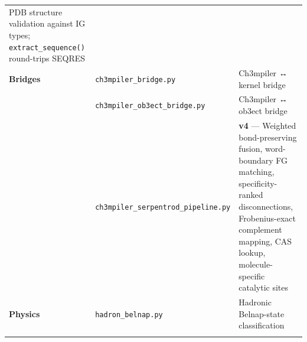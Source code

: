 \documentclass[12pt,a4paper]{article}
\begin{document}
\begin{longtable}[]{@{}lll@{}}
\begin{minipage}[t]{0.42\columnwidth}
PDB structure validation against IG types; \texttt{extract\_sequence()}
round-trips SEQRES\strut
\end{minipage}\tabularnewline
\begin{minipage}[t]{0.23\columnwidth}\raggedright
\textbf{Bridges}\strut
\end{minipage} & \begin{minipage}[t]{0.26\columnwidth}\raggedright
\texttt{ch3mpiler\_bridge.py}\strut
\end{minipage} & \begin{minipage}[t]{0.42\columnwidth}\raggedright
Ch3mpiler ↔ kernel bridge\strut
\end{minipage}\tabularnewline
\begin{minipage}[t]{0.23\columnwidth}\raggedright
\strut
\end{minipage} & \begin{minipage}[t]{0.26\columnwidth}\raggedright
\texttt{ch3mpiler\_ob3ect\_bridge.py}\strut
\end{minipage} & \begin{minipage}[t]{0.42\columnwidth}\raggedright
Ch3mpiler ↔ ob3ect bridge\strut
\end{minipage}\tabularnewline
\begin{minipage}[t]{0.23\columnwidth}\raggedright
\strut
\end{minipage} & \begin{minipage}[t]{0.26\columnwidth}\raggedright
\texttt{ch3mpiler\_serpentrod\_pipeline.py}\strut
\end{minipage} & \begin{minipage}[t]{0.42\columnwidth}\raggedright
\textbf{v4} --- Weighted bond-preserving fusion, word-boundary FG
matching, specificity-ranked disconnections, Frobenius-exact complement
mapping, CAS lookup, molecule-specific catalytic sites\strut
\end{minipage}\tabularnewline
\begin{minipage}[t]{0.23\columnwidth}\raggedright
\textbf{Physics}\strut
\end{minipage} & \begin{minipage}[t]{0.26\columnwidth}\raggedright
\texttt{hadron\_belnap.py}\strut
\end{minipage} & \begin{minipage}[t]{0.42\columnwidth}\raggedright
Hadronic Belnap-state classification\strut
\end{minipage}\tabularnewline
\begin{minipage}[t]{0.23\columnwidth}\raggedright

\end{minipage}
\end{longtable}
\end{document}
